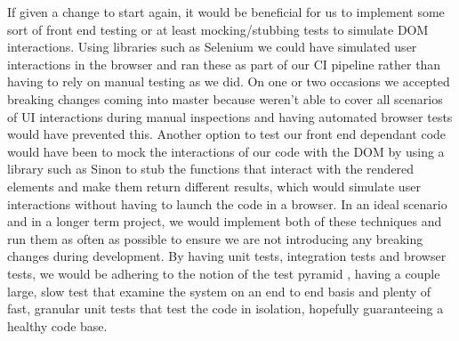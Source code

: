 \documentclass[a4paper]{report}
\begin{document}
	\par If given a change to start again, it would be beneficial for us to implement some sort of front end testing or at least mocking/stubbing tests to simulate DOM interactions. Using libraries such as Selenium we could have simulated user interactions in the browser and ran these as part of our CI pipeline rather than having to rely on manual testing as we did. On one or two occasions we accepted breaking changes coming into master because weren't able to cover all scenarios of UI interactions during manual inspections and having automated browser tests would have prevented this. Another option to test our front end dependant code would have been to mock the interactions of our code with the DOM by using a library such as Sinon to stub the functions that interact with the rendered elements and make them return different results, which would simulate user interactions without having to launch the code in a browser. In an ideal scenario and in a longer term project, we would implement both of these techniques and run them as often as possible to ensure we are not introducing any breaking changes during development. By having unit tests, integration tests and browser tests, we would be adhering to the notion of the test pyramid \cite{vocke_practical_2018}, having a couple large, slow test that examine the system on an end to end basis and plenty of fast, granular unit tests that test the code in isolation, hopefully guaranteeing a healthy code base.\newline
	
\end{document}

